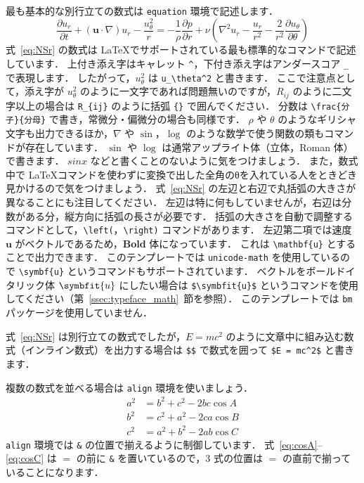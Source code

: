 最も基本的な別行立ての数式は \verb|equation| 環境で記述します．
\begin{equation}
    \frac{\partial u_r}{\partial t} + (\mathbf{u}\cdot\nabla)u_r - \frac{u_\theta^2}{r} = -\frac{1}{\rho}\frac{\partial p}{\partial r} + \nu\left(\nabla^2 u_r - \frac{u_r}{r^2} - \frac{2}{r^2}\frac{\partial u_\theta}{\partial \theta}\right)
    \label{eq:NSr}
\end{equation}
式~\eqref{eq:NSr} の数式は \LaTeX でサポートされている最も標準的なコマンドで記述しています．
上付き添え字はキャレット \verb|^|，下付き添え字はアンダースコア \verb|_| で表現します．
したがって，$u_\theta^2$ は \verb|u_\theta^2| と書きます．
ここで注意点として，添え字が $u_\theta^2$ のように一文字であれば問題無いのですが，$R_{ij}$ のように二文字以上の場合は \verb|R_{ij}| のように括弧 \verb|{}| で囲んでください．
分数は \verb|\frac{分子}{分母}| で書き，常微分・偏微分の場合も同様です．
$\rho$ や $\theta$ のようなギリシャ文字も出力できるほか，$\nabla$ や $\sin$，$\log$ のような数学で使う関数の類もコマンドが存在しています．
$\sin$ や $\log$ は通常アップライト体（立体，Roman 体）で書きます．
$sin x$ などと書くことのないように気をつけましょう．
また，数式中で \LaTeX コマンドを使わずに変換で出した全角のθを入れている人をときどき見かけるので気をつけましょう．
式~\eqref{eq:NSr} の左辺と右辺で丸括弧の大きさが異なることにも注目してください．
左辺は特に何もしていませんが，右辺は分数がある分，縦方向に括弧の長さが必要です．
括弧の大きさを自動で調整するコマンドとして，\verb|\left(|，\verb|\right)| コマンドがあります．
左辺第二項では速度 $\mathbf{u}$ がベクトルであるため，\textbf{Bold} 体になっています．
これは \verb|\mathbf{u}| とすることで出力できます．
このテンプレートでは \verb|unicode-math| を使用しているので \verb|\symbf{u}| というコマンドもサポートされています．
ベクトルをボールドイタリック体 $\symbfit{u}$ にしたい場合は \verb|$\symbfit{u}$| というコマンドを使用してください（第~\ref{ssec:typeface_math}~節を参照）．
このテンプレートでは \verb|bm| パッケージを使用していません．

式~\eqref{eq:NSr} は別行立ての数式でしたが，$E = mc^2$ のように文章中に組み込む数式（インライン数式）を出力する場合は \verb|$$| で数式を囲って \verb|$E = mc^2$| と書きます．

複数の数式を並べる場合は \verb|align| 環境を使いましょう．
\begin{align}
    a^2 &= b^2 + c^2 - 2bc\cos A \label{eq:cosA} \\
    b^2 &= c^2 + a^2 - 2ca\cos B \label{eq:cosB} \\
    c^2 &= a^2 + b^2 - 2ab\cos C \label{eq:cosC}
\end{align}
\verb|align| 環境では \verb|&| の位置で揃えるように制御しています．
式~\eqref{eq:cosA}--\eqref{eq:cosC} は $=$ の前に \verb|&| を置いているので，3 式の位置は $=$ の直前で揃っていることになります．

